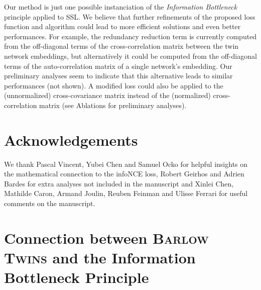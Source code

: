 \documentclass{article}
\newcommand{\AlgoName}{\textsc{Barlow Twins}}
\begin{document}
Our method is just one possible instanciation of the \emph{Information Bottleneck} principle applied to SSL. We believe that further refinements of the proposed loss function and algorithm could lead to more efficient solutions and even better performances. For example, the redundancy reduction term is currently computed from the off-diagonal terms of the cross-correlation matrix between the twin network embeddings, but alternatively it could be computed from the off-diagonal terms of the auto-correlation matrix of a single network's embedding. Our preliminary analyses seem to indicate that this alternative leads to similar performances (not shown). A modified loss could also be applied to the (unnormalized) cross-covariance matrix instead of the (normalized) cross-correlation matrix (see Ablations for preliminary analyses). 















































 \section*{Acknowledgements}
We thank Pascal Vincent, Yubei Chen and Samuel Ocko for helpful insights on the mathematical connection to the infoNCE loss, Robert Geirhos and Adrien Bardes for extra analyses not included in the manuscript and Xinlei Chen, Mathilde Caron, Armand Joulin, Reuben Feinman and Ulisse Ferrari for useful comments on the manuscript.



\newpage
\appendix





\section{Connection between \AlgoName{} and the Information Bottleneck Principle}
\end{document}
